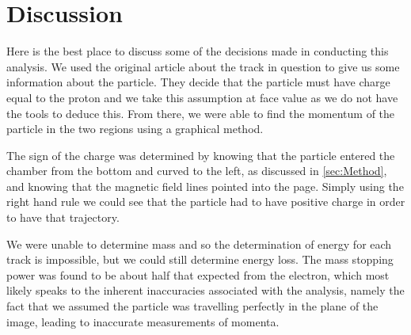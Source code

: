 \documentclass[11pt]{article}
\numberwithin{equation}{section}
\numberwithin{figure}{section}
\numberwithin{table}{section}
\begin{document}
\section{Discussion}\label{sec:Discussion}
Here is the best place to discuss some of the decisions made in conducting this analysis. We used the original article about the track in question to give us some information about the particle. They decide that the particle must have charge equal to the proton and we take this assumption at face value as we do not have the tools to deduce this. From there, we were able to find the momentum of the particle in the two regions using a graphical method. 

The sign of the charge was determined by knowing that the particle entered the chamber from the bottom and curved to the left, as discussed in \cref{sec:Method}, and knowing that the magnetic field lines pointed into the page. Simply using the right hand rule we could see that the particle had to have positive charge in order to have that trajectory. 

We were unable to determine mass and so the determination of energy for each track is impossible, but we could still determine energy loss. The mass stopping power was found to be about half that expected from the electron, which most likely speaks to the inherent inaccuracies associated with the analysis, namely the fact that we assumed the particle was travelling perfectly in the plane of the image, leading to inaccurate measurements of momenta.

\newpage
\printbibliography
\end{document}
